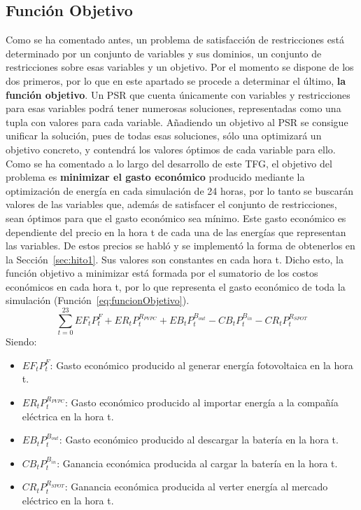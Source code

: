 \subsection{Función Objetivo}
Como se ha comentado antes, un problema de satisfacción de restricciones está determinado por un conjunto de variables y sus dominios, un conjunto de restricciones sobre esas variables y un objetivo. Por el momento se dispone de los dos primeros, por lo que en este apartado se procede a determinar el último, \textbf{la función objetivo}. Un PSR que cuenta únicamente con variables y restricciones para esas variables podrá tener numerosas soluciones, representadas como una tupla con valores para cada variable. Añadiendo un objetivo al PSR se consigue unificar la solución, pues de todas esas soluciones, sólo una optimizará un objetivo concreto, y contendrá los valores óptimos de cada variable para ello. Como se ha comentado a lo largo del desarrollo de este \gls{TFG}, el objetivo del problema es \textbf{minimizar el gasto económico} producido mediante la optimización de energía en cada simulación de 24 horas, por lo tanto se buscarán valores de las variables que, además de satisfacer el conjunto de restricciones, sean óptimos para que el gasto económico sea mínimo. Este gasto económico es dependiente del precio en la hora t de cada una de las energías que representan las variables. De estos precios se habló y se implementó la forma de obtenerlos en la Sección~\ref{sec:hito1}. Sus valores son constantes en cada hora t. Dicho esto, la función objetivo a minimizar está formada por el sumatorio de los costos económicos en cada hora t, por lo que representa el gasto económico de toda la simulación (Función~\ref{eq:funcionObjetivo}).
\begin{equation}
\label{eq:funcionObjetivo}
\sum_{t=0}^{23} EF_{t}P_{t}^{F} + ER_{t}P_{t}^{R_{PVPC}} + EB_{t}P_{t}^{B_{out}} - CB_{t}P_{t}^{B_{in}} - CR_{t}P_{t}^{R_{SPOT}}
\end{equation}
Siendo:
\begin{itemize}
\item $ EF_{t}P_{t}^{F} $: Gasto económico producido al generar energía fotovoltaica en la hora t.
\item $ ER_{t}P_{t}^{R_{PVPC}} $: Gasto económico producido al importar energía a la compañía eléctrica en la hora t.
\item $ EB_{t}P_{t}^{B_{out}} $: Gasto económico producido al descargar la batería en la hora t.
\item $ CB_{t}P_{t}^{B_{in}} $: Ganancia económica producida al cargar la batería en la hora t.
\item $ CR_{t}P_{t}^{R_{SPOT}} $: Ganancia económica producida al verter energía al mercado eléctrico en la hora t.
\end{itemize}

